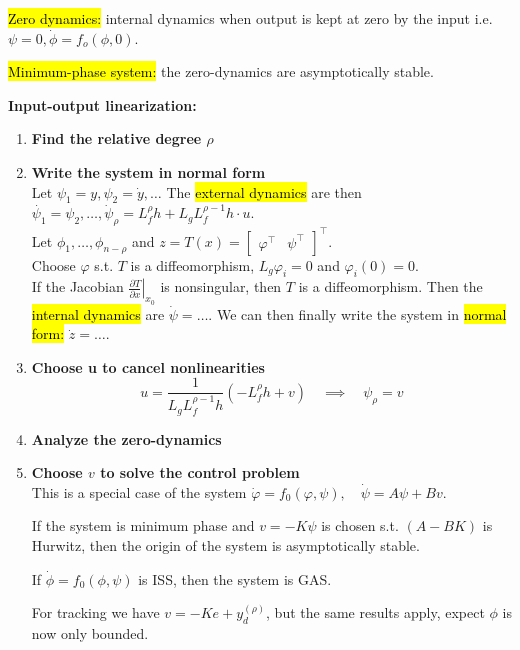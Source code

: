 \begin{definition}
   \hl{Zero dynamics:} internal dynamics when output is kept at zero by the input i.e. $\psi = 0, \dot{\phi} = f_o(\phi, 0)$.
\end{definition}
\begin{definition}
    \hl{Minimum-phase system:} the zero-dynamics are asymptotically stable.
\end{definition}

\begin{tcolorbox}[colback=white, colframe=teal]
    \textbf{Input-output linearization:}\\
    \begin{enumerate}
        \item \textbf{Find the relative degree $\rho$}\\
        \item \textbf{Write the system in normal form}\\
        Let $\psi_1 = y, \psi_2 = \dot{y}, \dots$
        The \hl{external dynamics} are then $\dot{\psi_1} = \psi_2, \dots, \dot{\psi}_{\rho}=L_{f}^{\rho} h+L_{g} L_{f}^{\rho-1} h \cdot u$.\\
        Let $\phi_1, \dots, \phi_{n-\rho}$ and $z = T(x) =
        [\begin{array}{cc}\varphi^{\top} & \psi^{\top} \end{array}]^{\top}$.\\
        Choose $\varphi$ s.t. $T$ is a diffeomorphism, $L_{g} \varphi_{i}=0$ and $\varphi_i(0)=0$.\\
        If the Jacobian $\left.\frac{\partial T}{\partial x}\right|_{x_{0}}$ is nonsingular, then $T$ is a diffeomorphism. Then the \hl{internal dynamics} are $\dot{\psi} = \dots$.
        We can then finally write the system in \hl{normal form:} $\dot{z} = \dots$.
        \item \textbf{Choose u to cancel nonlinearities}\\
        \begin{equation}
            u=\frac{1}{L_{g} L_{f}^{\rho-1} h}\left(-L_{f}^{\rho} h+v\right) \quad \implies \quad \psi_{\rho} = v
        \end{equation}
        \item \textbf{Analyze the zero-dynamics}\\
        \item \textbf{Choose $v$ to solve the control problem}\\
        This is a special case of the system $\dot{\varphi}=f_{0}(\varphi, \psi), \quad \dot{\psi}=A \psi+B v$.
        \begin{lemma}
            If the system is minimum phase and $v=-K\psi$ is chosen s.t. $(A-BK)$ is Hurwitz, then the origin of the system is asymptotically stable.
        \end{lemma}
        \begin{lemma}
            If $\dot{\phi} = f_0(\phi, \psi)$ is ISS, then the system is GAS.
        \end{lemma}
        For tracking we have $v=-K e+y_{d}^{(\rho)}$, but the same results apply, expect $\phi$ is now only bounded.
    \end{enumerate}
\end{tcolorbox}

